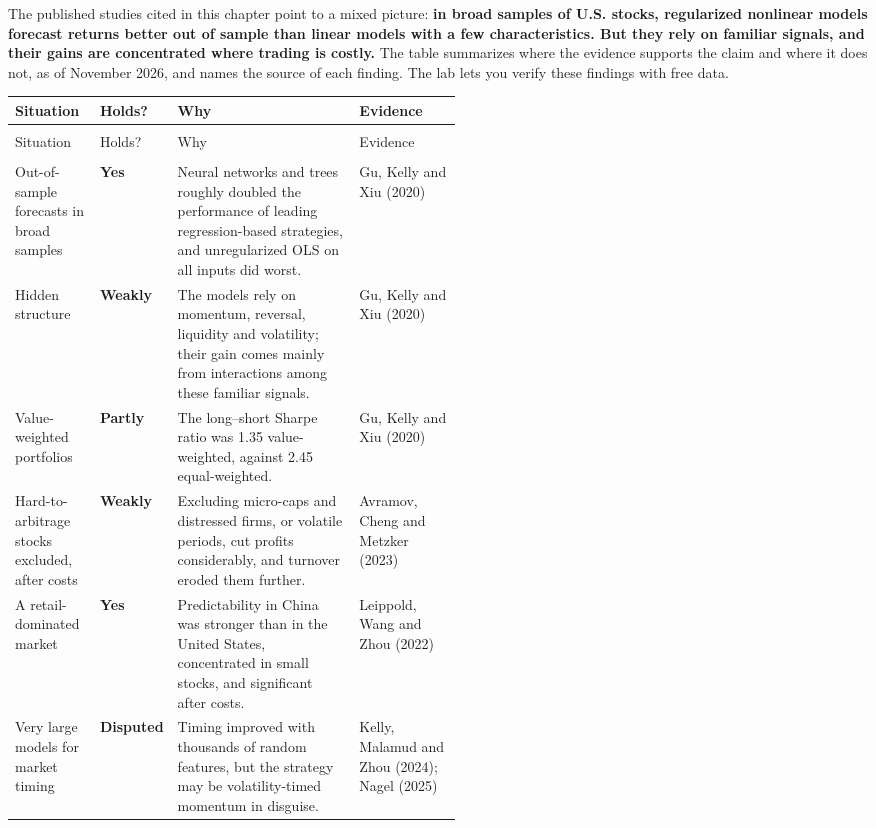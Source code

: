 The published studies cited in this chapter point to a mixed picture: \textbf{in broad samples of U.S. stocks, regularized nonlinear models forecast returns better out of sample than linear models with a few characteristics. But they rely on familiar signals, and their gains are concentrated where trading is costly.} The table summarizes where the evidence supports the claim and where it does not, as of November 2026, and names the source of each finding. The lab lets you verify these findings with free data.

{\small
\begin{longtable}{@{}>{\raggedright\arraybackslash}p{0.19\linewidth}>{\raggedright\arraybackslash}p{0.10\linewidth}>{\raggedright\arraybackslash}p{}>{\raggedright\arraybackslash}p{0.23\linewidth}@{}}
\toprule
Situation & Holds? & Why & Evidence \\
\midrule
\endfirsthead
\multicolumn{4}{@{}l}{\emph{(continued)}} \\
\toprule
Situation & Holds? & Why & Evidence \\
\midrule
\endhead
\midrule
\multicolumn{4}{r@{}}{\emph{(continued on the next page)}} \\
\endfoot
\bottomrule
\endlastfoot
Out-of-sample forecasts in broad samples & \textbf{Yes} & Neural networks and trees roughly doubled the performance of leading regression-based strategies, and unregularized OLS on all inputs did worst. & Gu, Kelly and Xiu (2020) \\
\addlinespace[3pt]
Hidden structure & \textbf{Weakly} & The models rely on momentum, reversal, liquidity and volatility; their gain comes mainly from interactions among these familiar signals. & Gu, Kelly and Xiu (2020) \\
\addlinespace[3pt]
Value-weighted portfolios & \textbf{Partly} & The long--short Sharpe ratio was 1.35 value-weighted, against 2.45 equal-weighted. & Gu, Kelly and Xiu (2020) \\
\addlinespace[3pt]
Hard-to-arbitrage stocks excluded, after costs & \textbf{Weakly} & Excluding micro-caps and distressed firms, or volatile periods, cut profits considerably, and turnover eroded them further. & Avramov, Cheng and Metzker (2023) \\
\addlinespace[3pt]
A retail-dominated market & \textbf{Yes} & Predictability in China was stronger than in the United States, concentrated in small stocks, and significant after costs. & Leippold, Wang and Zhou (2022) \\
\addlinespace[3pt]
Very large models for market timing & \textbf{Disputed} & Timing improved with thousands of random features, but the strategy may be volatility-timed momentum in disguise. & Kelly, Malamud and Zhou (2024); Nagel (2025) \\
\end{longtable}
}


